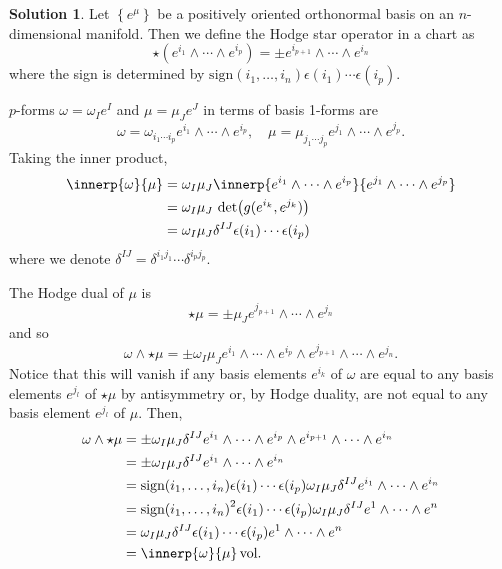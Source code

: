 \documentclass[11pt, a4paper]{report}
\theoremstyle{definition}
\newtheorem{sol}{Solution}[part]
\begin{document}
\begin{sol}

Let $\left\{e^\mu\right\}$ be a positively oriented orthonormal basis on an $n$-dimensional manifold. Then we define the Hodge star operator in a chart as
\[
    \star (e^{i_1} \wedge \cdots \wedge e^{i_p}) = \pm e^{i_{p + 1}} \wedge \cdots \wedge e^{i_n}
\]
where the sign is determined by $\text{sign}(i_1, \ldots, i_n) \epsilon(i_1) \cdots \epsilon(i_p)$.

$p$-forms $\omega = \omega_I e^I$ and $\mu = \mu_J e^J$ in terms of basis 1-forms are
\[
    \omega = \omega_{i_1 \cdots i_p} e^{i_1} \wedge \cdots \wedge e^{i_p}, \quad
    \mu = \mu_{j_1 \cdots j_p} e^{j_1} \wedge \cdots \wedge e^{j_p}.
\]
Taking the inner product,
\begin{align*}
    \innerp{\omega}{\mu} &= \omega_I \mu_J \innerp{e^{i_1} \wedge \cdots \wedge e^{i_p}}{e^{j_1} \wedge \cdots \wedge e^{j_p}} \\
        &= \omega_I \mu_J \, \det \bigl(g(e^{i_k}, e^{j_k})\bigr) \\
        &= \omega_I \mu_J \delta^{IJ} \epsilon(i_1) \cdots \epsilon(i_p)
\end{align*}
where we denote $\delta^{IJ} = \delta^{i_1 j_1} \cdots \delta^{i_p j_p}$.

The Hodge dual of $\mu$ is
\[
    \star \mu = \pm \mu_J e^{j_{p + 1}} \wedge \cdots \wedge e^{j_n}
\]
and so
\[
    \omega \wedge \star \mu = \pm \omega_I \mu_J e^{i_1} \wedge \cdots \wedge e^{i_p} \wedge e^{j_{p + 1}} \wedge \cdots \wedge e^{j_n}.
\]
Notice that this will vanish if any basis elements $e^{i_k}$ of $\omega$ are equal to any basis elements $e^{j_l}$ of $\star \mu$ by antisymmetry or, by Hodge duality, are not equal to any basis element $e^{j_l}$ of $\mu$.
Then,
\begin{align*}
    \omega \wedge \star \mu &= \pm \omega_I \mu_J \delta^{IJ} e^{i_1} \wedge \cdots \wedge e^{i_p} \wedge e^{i_{p + 1}} \wedge \cdots \wedge e^{i_n} \\
        &= \pm \omega_I \mu_J \delta^{IJ} e^{i_1} \wedge \cdots \wedge e^{i_n} \\
        &= \text{sign}(i_1, \ldots, i_n) \epsilon(i_1) \cdots \epsilon(i_p) \omega_I \mu_J \delta^{IJ} e^{i_1} \wedge \cdots \wedge e^{i_n} \\
        &= {\text{sign}(i_1, \ldots, i_n)}^2 \epsilon(i_1) \cdots \epsilon(i_p) \omega_I \mu_J \delta^{IJ} e^1 \wedge \cdots \wedge e^n \\
        &= \omega_I \mu_J \delta^{IJ} \epsilon(i_1) \cdots \epsilon(i_p) e^1 \wedge \cdots \wedge e^n \\
        &= \innerp{\omega}{\mu} \, \text{vol}.
\end{align*}

\end{sol}
\end{document}
